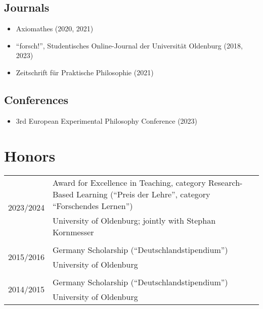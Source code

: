 \documentclass[a4paper,10pt]{article}
\begin{document}
\subsection*{Journals}
\begin{itemize}
   \item Axiomathes (2020, 2021)
   \item \enquote{forsch!}, Studentisches Online-Journal der Universität Oldenburg (2018, 2023)
   \item Zeitschrift für Praktische Philosophie (2021)
\end{itemize}

\subsection*{Conferences}
\begin{itemize}
   \item 3rd European Experimental Philosophy Conference (2023)
\end{itemize}


\clearpage
\section{Honors}
\begin{longtable}{p{}p{11cm}}

\multirow{2}{2,25cm}{\footnotesize{2023/2024}} & Award for Excellence in Teaching, category Research-Based Learning (\enquote{Preis der Lehre}, category \enquote{Forschendes Lernen})\\
& \footnotesize{University of Oldenburg; jointly with Stephan Kornmesser}\\
\\
\multirow{2}{2,25cm}{\footnotesize{2015/2016}} & Germany Scholarship (\enquote{Deutschlandstipendium})\\
& \footnotesize{University of Oldenburg}\\
\\
\multirow{2}{2,25cm}{\footnotesize{2014/2015}} & Germany Scholarship (\enquote{Deutschlandstipendium})\\
& \footnotesize{University of Oldenburg}\\
\end{longtable}


\clearpage
\end{document}
